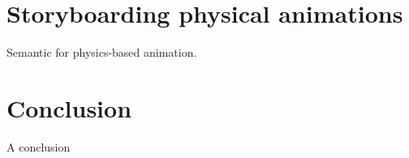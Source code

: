 \documentclass[11pt, oneside, a4paper]{memoir}
\begin{document}
\chapter{Storyboarding physical animations}
Semantic for physics-based animation.

\chapter{Conclusion}
A conclusion



\backmatter

\printbibliography

\listoffigures

\listofalgorithms
 
\listoftables
\end{document}
